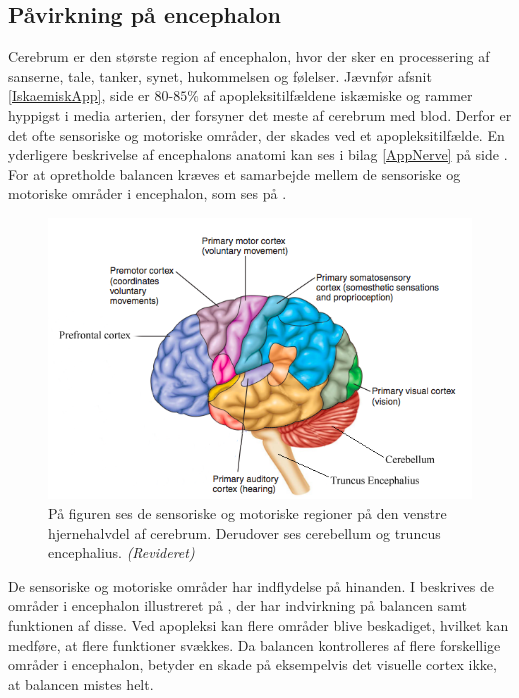 \subsection{Påvirkning på encephalon}\label{HjerneSenMot}
Cerebrum er den største region af encephalon, hvor der sker en processering af sanserne, tale, tanker, synet, hukommelsen og følelser. \cite{Martini2012} Jævnfør afsnit \ref{IskaemiskApp}, side \pageref{IskaemiskApp} er $80$-$85\%$ af apopleksitilfældene iskæmiske og rammer hyppigst i media arterien, der forsyner det meste af cerebrum med blod. Derfor er det ofte sensoriske og motoriske områder, der skades ved et apopleksitilfælde. \cite{Sundhed.dk2014,Kruuse2015a,Gade2004,Boss2010} En yderligere beskrivelse af encephalons anatomi kan ses i bilag \ref{AppNerve} på side \pageref{AppNerve}. For at opretholde balancen kræves et samarbejde mellem de sensoriske og motoriske områder i encephalon, som ses på .

\begin{figure}[H]
	\centering
	\includegraphics[scale=0.8]{figures/bProblemanalyse/Encephalon3.png}
	\caption{På figuren ses de sensoriske og motoriske regioner på den venstre hjernehalvdel af cerebrum. Derudover ses cerebellum og truncus encephalius. \textit{(Revideret)} \cite{Stanfield2014}}
	\label{Enc}
\end{figure}

\noindent De sensoriske og motoriske områder har indflydelse på hinanden. I  beskrives de områder i encephalon illustreret på , der har indvirkning på balancen samt funktionen af disse. Ved apopleksi kan flere områder blive beskadiget, hvilket kan medføre, at flere funktioner svækkes. Da balancen kontrolleres af flere forskellige områder i encephalon, betyder en skade på eksempelvis det visuelle cortex ikke, at balancen mistes helt. 

